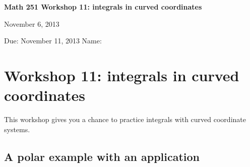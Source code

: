 \documentclass[12pt]{exam}
\theoremstyle{definition}
\begin{document}
\lstset{language=R}
\noindent
\textbf{{\large Math 251 \hfill Workshop 11: integrals in curved coordinates}}

\noindent
November 6, 2013 

\noindent
Due: November 11, 2013 \hfill Name: \underline{\hspace{3in}} 

\noindent

\section{Workshop 11: integrals in curved coordinates}

This workshop gives you a chance to practice integrals with curved
coordinate systems.

\subsection{A polar example with an application}
\end{document}
